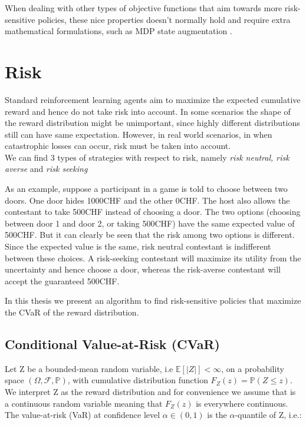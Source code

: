 When dealing with other types of objective functions that aim towards more risk-sensitive
policies, these nice properties doesn't normally hold
and require extra mathematical formulations, such as MDP state augmentation \citep{Chow2015}.



\section{Risk}
Standard reinforcement learning agents aim to maximize the expected cumulative reward and hence
do not take risk into account. In some scenarios the shape of the reward distribution might be unimportant,
since highly different distributions still can have same expectation. However, in real world scenarios, 
in  when catastrophic losses can occur, risk must be taken into account.\\
We can find 3 types of strategies with respect to risk, namely \textit{risk neutral, risk averse} and \textit{risk seeking}

As an example, suppose a participant in a game is told to choose between two doors.
One door hides 1000CHF and the other 0CHF. The host also allows the contestant to 
take 500CHF instead of choosing a door. The two options (choosing between door 1 and door 2, or taking 500CHF)
have the same expected value of 500CHF. But it can clearly be seen that the risk among two options is different.
Since the expected value is the same, risk neutral contestant is indifferent between these choices.
A risk-seeking contestant will maximize its utility from the uncertainty and hence choose a door,
whereas the risk-averse contestant  will accept the guaranteed 500CHF.


In this thesis we present an algorithm to find risk-sensitive policies
that maximize the CVaR of the reward distribution.

\subsection{Conditional Value-at-Risk (CVaR)}

Let Z be a bounded-mean random variable, i.e $\mathbb E[|Z|] < \infty$, on a probability space 
$(\Omega, \mathcal{F}, \mathbb P)$, with cumulative distribution
function $F_Z(z) = \mathbb P (Z \leq z)$. We interpret Z as the reward distribution and for convenience 
we assume that is a continuous random variable meaning that $F_Z(z)$ is everywhere continuous.
The value-at-risk (VaR) at confidence level $\alpha \in (0,1) $ is the $\alpha$-quantile of Z, i.e.:

